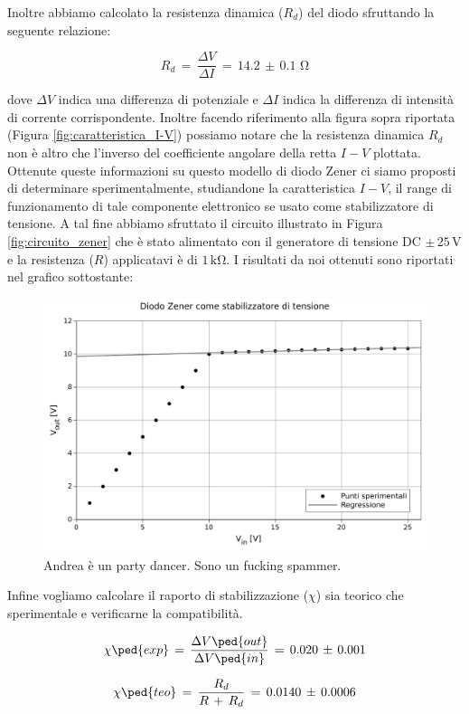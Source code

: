 Inoltre abbiamo calcolato la resistenza dinamica ($R_d$) del diodo sfruttando la seguente relazione:

\begin{equation}
	R_d \,=\, \frac{\Delta V}{\Delta I} \,=\, 14.2\,\pm\,0.1 \,\,\si{\ohm}
\end{equation}


dove $\Delta V$ indica una differenza di potenziale e $\Delta I$ indica la differenza di intensità di corrente corrispondente. Inoltre facendo riferimento alla figura sopra riportata (Figura \ref{fig:caratteristica_I-V}) possiamo notare che la resistenza dinamica $R_d$ non è altro che l'inverso del coefficiente angolare della retta $I-V$ plottata.\\

Ottenute queste informazioni su questo modello di diodo Zener ci siamo proposti di determinare sperimentalmente, studiandone la caratteristica $I-V$, il range di funzionamento di tale componente elettronico se usato come stabilizzatore di tensione.
A tal fine abbiamo sfruttato il circuito illustrato in Figura \ref{fig:circuito_zener} che è stato alimentato con il generatore di tensione DC $\pm\,25\,\si{\volt}$ e la resistenza ($R$) applicatavi è di $1\,\si{\kilo\ohm}$.
I risultati da noi ottenuti sono riportati nel grafico sottostante:

\begin{figure}
    \includegraphics[scale=0.7]{stab.pdf}
    \caption{Andrea è un party dancer. Sono un fucking spammer.}
    \label{fig:stab_tensione}
\end{figure}

Infine vogliamo calcolare il raporto di stabilizzazione ($\chi$) sia teorico che sperimentale e verificarne la compatibilità.

\begin{equation}
	\chi\ped{exp} \,=\, \frac{\Delta V\ped{out}}{\Delta V\ped{in}} \,=\, 0.020\,\pm\,0.001
	\label{eq:c_exp}
\end{equation}

\begin{equation}
	\chi\ped{teo} \,=\, \frac{R_d}{R\,+\,R_d} \,=\, 0.0140\,\pm\,0.0006
	\label{eq:c_teo}
\end{equation}
